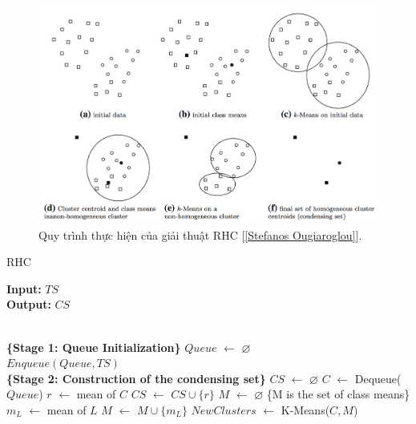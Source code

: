\documentclass[13pt,oneside]{scrbook}
\newcommand*\Let[2]{\State #1 $\gets$ #2}
\let\emptyset\varnothing
\begin{document}
\begin{figure}[h!]
	\begin{center}
		\includegraphics[width=140mm]{RHC.png}
		\caption{Quy trình thực hiện của giải thuật RHC [\ref{Stefanos Ougiaroglou}].}
		\label{QuiTrinh_RHC}
	\end{center}
\end{figure}

\begin{algorithm}[h!]
  \caption{RHC
   \label{alg:rhc}}
    \textbf{Input:} $TS$\\
    \textbf{Output:} $CS$
  \begin{algorithmic}[1]
    \Statex
      \\\textbf{\{Stage 1: Queue Initialization\}}
      \Let{$Queue$}{$\emptyset$}
      \\$Enqueue(Queue, TS)$
      \\\textbf{\{Stage 2: Construction of the condensing set\}}
      \Let{$CS$}{$\emptyset$}
      \Repeat
          \Let{$C$}{Dequeue($Queue$)}
          \Let{$r$}{mean of $C$}
          \Let{$CS$}{$CS \cup \{r\}$}
      \Else
          \Let{$M$}{$\emptyset$} \{M is the set of class means\}
              \Let{$m_L$}{mean of $L$}
              \Let{$M$}{$M \cup \{m_L\}$}
          \EndFor
          \Let{$NewClusters$}{K-Means($C,M$)}
          \EndFor
      \EndIf
      \State {}
  \end{algorithmic}
\end{algorithm}
\end{document}
